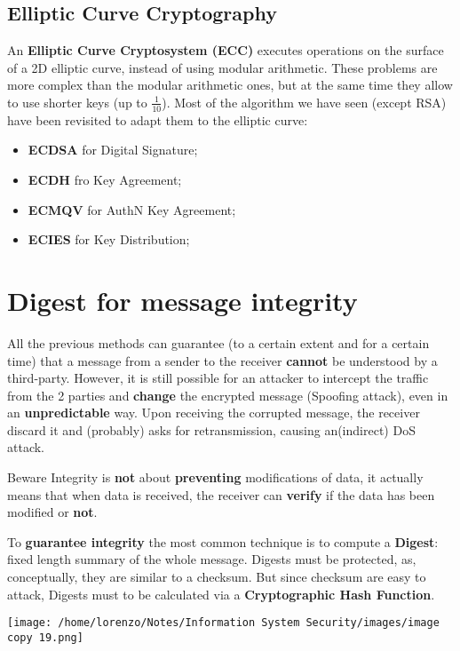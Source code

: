 \subsection{Elliptic Curve Cryptography}

An \textbf{Elliptic Curve Cryptosystem (ECC)} executes operations on the surface of a 2D elliptic
curve, instead of using modular arithmetic. These problems are more complex than the modular
arithmetic ones, but at the same time they allow to use shorter keys (up to \(\frac{1}{10}\)). Most of the
algorithm we have seen (except RSA) have been revisited to adapt them to the elliptic curve:
\begin{itemize}
    \item \textbf{ECDSA} for Digital Signature;
    \item \textbf{ECDH} fro Key Agreement;
    \item \textbf{ECMQV} for AuthN Key Agreement;
    \item \textbf{ECIES} for Key Distribution;
\end{itemize}

\section{Digest for message integrity}
All the previous methods can guarantee (to a certain extent and for a certain time) that a message from a sender to the receiver \textbf{cannot} be understood by a third-party. However, it is still possible for an attacker to intercept the traffic from the 2 parties and \textbf{change} the encrypted message (Spoofing attack), even in an \textbf{unpredictable} way. Upon receiving the corrupted message, the receiver discard it and (probably) asks for retransmission, causing an(indirect) DoS attack.
\begin{center}
\begin{quotebox-red}{Beware}
Integrity is \textbf{not} about \textbf{preventing} modifications of data, it actually means that when data is received, the receiver can \textbf{verify} if the data has been modified or \textbf{not}.
\end{quotebox-red}
\end{center}
\noindent
\begin{minipage}{0.5\textwidth}
\vspace{-1.5cm}
To \textbf{guarantee integrity} the most common technique is to compute a \textbf{Digest}: fixed length summary of the whole message. Digests must be protected, as, conceptually, they are similar
to a checksum. But since checksum are easy to attack, Digests must to be calculated via a \textbf{Cryptographic Hash Function}.
\end{minipage} 
\hspace{0cm}
\begin{minipage}{0.5\textwidth}
    \centering
    \texttt{[image: /home/lorenzo/Notes/Information System Security/images/image copy 19.png]}
\end{minipage}


